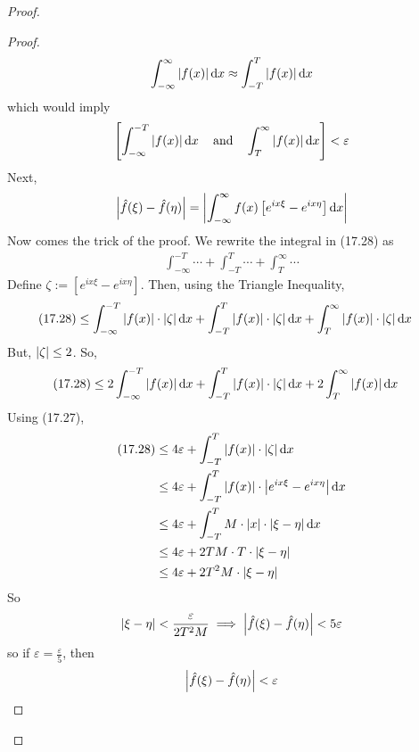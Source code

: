 \begin{proof}
\begin{proof}
\begin{align}
            \int_{-\infty}^\infty \abs{f(x)} \dd{x} \approx \int_{-T}^T \abs{f(x)} \dd{x}
        \end{align}
        which would imply
        \begin{align}
            \left[\int_{-\infty}^{-T} \abs{f(x)} \dd{x} \qand \int_{T}^\infty \abs{f(x)} \dd{x}\right] < \varepsilon
        \end{align}
        Next,
        \begin{align}
            \abs{\hat{f}(\xi) - \hat{f}(\eta)} = \abs{\int_{-\infty}^\infty f(x) \left[ e^{ix\xi} - e^{ix\eta} \right] \dd{x}}
        \end{align}
        Now comes the trick of the proof. We rewrite the integral in (17.28) as
        \begin{align}
            \int_{-\infty}^{-T} \cdots + \int_{-T}^{T} \cdots + \int_{T}^{\infty} \cdots
        \end{align}
        Define $\zeta := \left[ e^{ix\xi} - e^{ix\eta} \right]$. Then, using the Triangle Inequality,
        \begin{align}
            (17.28) &\le \int_{-\infty}^{-T} \abs{f(x)} \cdot \abs{\zeta} \dd{x} + \int_{-T}^{T} \abs{f(x)} \cdot \abs{\zeta} \dd{x} + \int_{T}^{\infty} \abs{f(x)} \cdot \abs{\zeta} \dd{x}
        \end{align}
        But, $\abs{\zeta} \le 2$. So,
        \begin{align}
            (17.28) &\le 2\int_{-\infty}^{-T} \abs{f(x)} \dd{x} + \int_{-T}^{T} \abs{f(x)} \cdot \abs{\zeta} \dd{x} + 2\int_{T}^{\infty} \abs{f(x)} \dd{x}
        \end{align}
        Using (17.27),
        \begin{align}
            (17.28) &\le 4\varepsilon + \int_{-T}^{T} \abs{f(x)} \cdot \abs{\zeta} \dd{x}\\
            &\le 4\varepsilon + \int_{-T}^{T} \abs{f(x)} \cdot \abs{e^{ix\xi} - e^{ix\eta}} \dd{x}\\
            &\le 4\varepsilon + \int_{-T}^{T} M \cdot \abs{x} \cdot \abs{\xi - \eta} \dd{x}\\
            &\le 4\varepsilon + 2TM \cdot T \cdot \abs{\xi - \eta}\\
            &\le 4\varepsilon + 2T^2M \cdot \abs{\xi - \eta}
        \end{align}
        So
        \begin{align}
            \abs{\xi - \eta} < \frac{\varepsilon}{2T^2M} \implies \abs{\hat{f}(\xi) - \hat{f}(\eta)} < 5\varepsilon
        \end{align}
        so if $\varepsilon = \frac{\varepsilon}{5}$, then
        \begin{align}
            \abs{\hat{f}(\xi) - \hat{f}(\eta)} < \varepsilon
        \end{align}
    \end{proof}
\end{proof}

